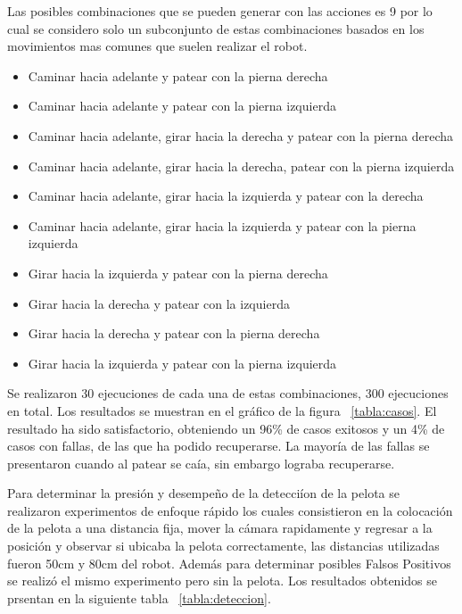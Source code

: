 Las posibles combinaciones que se pueden generar con las acciones es 9\! por lo cual se considero solo un subconjunto de estas combinaciones basados en los movimientos mas comunes que suelen realizar el robot.
\begin{itemize}
\setlength{\itemsep}{1pt}
\item Caminar hacia adelante y patear con la pierna derecha 
\item Caminar hacia adelante y patear con la pierna izquierda
\item Caminar hacia adelante, girar hacia la derecha y patear con la pierna derecha
\item Caminar hacia adelante, girar hacia la derecha, patear con la pierna izquierda 
\item Caminar hacia adelante, girar hacia la izquierda y patear con la derecha
\item Caminar hacia adelante, girar hacia la  izquierda y  patear con la pierna izquierda
\item Girar hacia la izquierda y patear con la pierna derecha
\item Girar hacia la derecha y patear con la izquierda
\item Girar hacia la derecha y patear con la pierna derecha
\item Girar hacia la izquierda y patear con la pierna izquierda
 \end{itemize}

Se realizaron 30 ejecuciones de cada una de estas combinaciones, 300 ejecuciones en total. Los resultados se muestran en el gráfico de la figura ~\ref{tabla:casos}. El resultado ha sido satisfactorio, obteniendo un 96\% de casos exitosos y un 4\% de casos con fallas, de las que ha podido recuperarse. La mayoría de las fallas se presentaron cuando al patear se caía, sin embargo lograba recuperarse.  

Para determinar la presi\'on y desempe\~no de la detecci\'ion de la pelota se realizaron experimentos de enfoque r\'apido los cuales consistieron en la colocaci\'on de la pelota a una distancia fija, mover la c\'amara rapidamente y regresar a la posici\'on y observar si ubicaba la pelota correctamente, las distancias utilizadas fueron 50cm y 80cm del robot. Adem\'as para determinar posibles Falsos Positivos se realiz\'o el mismo experimento pero sin la pelota. Los resultados obtenidos se prsentan en la siguiente tabla ~\ref{tabla:deteccion}.


